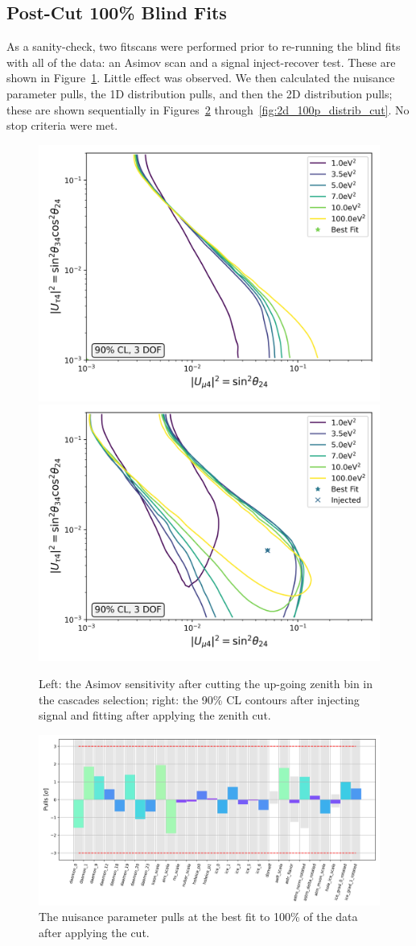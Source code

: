 \documentclass[main.tex]{subfiles}
\begin{document}
\subsection{Post-Cut 100\% Blind Fits}

As a sanity-check, two fitscans were performed prior to re-running the blind fits with all of the data: an Asimov scan and a signal inject-recover test. 
These are shown in Figure~\ref{fig:new_sense_again_cut}. 
Little effect was observed. 
We then calculated the nuisance parameter pulls, the 1D distribution pulls, and then the 2D distribution pulls; these are shown sequentially in Figures~\ref{fig:pulls_100p_cut} through~\ref{fig:2d_100p_distrib_cut}.
No stop criteria were met. 

\begin{figure}
    \centering
    \includegraphics[width=0.45\linewidth]{figures/blindfit/joint_asimov_cut_Realization_daemoncut_Asimov_sterile_0_cl0.9_dof3.png}%
    \includegraphics[width=0.45\linewidth]{figures/blindfit/joint_asimov_cut_signal_Realization_daemoncut_Asimov_sterile_4_cl0.9_dof3.png}
    \caption{Left: the Asimov sensitivity after cutting the up-going zenith bin in the cascades selection; right: the 90\% CL contours after injecting signal and fitting after applying the zenith cut.}\label{fig:new_sense_again_cut}
\end{figure}

\begin{figure}
    \centering
    \includegraphics[width=0.9\linewidth]{./figures/blindfit/pulls_IC86_data_full_cut_joint_data_full_cut.png}
    \caption{The nuisance parameter pulls at the best fit to 100\% of the data after applying the cut.}\label{fig:pulls_100p_cut}
\end{figure}
\end{document}
